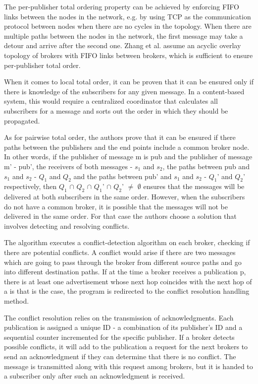 \documentclass{sigplanconf}
\begin{document}
The per-publisher total ordering property can be achieved by enforcing FIFO links between the nodes in the network, e.g. by using TCP as the communication protocol between nodes when there are no cycles in the topology. When there are multiple paths between the nodes in the network, the first message may take a detour and arrive after the second one. Zhang et al.\cite{totalorder} assume an acyclic overlay topology of brokers with FIFO links between brokers, which is sufficient to ensure per-publisher total order.

When it comes to local total order, it can be proven that it can be ensured only if there is knowledge of the subscribers for any given message. In a content-based system, this would require a centralized coordinator that calculates all subscribers for a message and sorts out the order in which they should be propagated.

As for pairwise total order, the authors prove that it can be ensured if there paths between the publishers and the end points include a common broker node. In other words, if the publisher of message m is pub and the publisher of message m' - pub', the receivers of both messages - $s_{1}$ and $s_{2}$, the paths between pub and $s_{1}$ and $s_{2}$ - $Q_{1}$ and $Q_{2}$ and the paths between pub' and $s_{1}$ and $s_{2}$ - $Q_{1}$' and $Q_{2}$' respectively, then $Q_{1}$ $\cap$ $Q_{2}$ $\cap$ $Q_{1}$' $\cap$ $Q_{2}$' $\neq$ $\emptyset$  ensures that the messages will be delivered at both subscribers in the same order. However, when the subscribers do not have a common broker, it is possible that the messages will not be delivered in the same order. For that case the authors choose a solution that involves detecting and resolving conflicts.

The algorithm executes a conflict-detection algorithm on each broker, checking if there are potential conflicts. A conflict would arise if there are two messages which are going to pass through the broker from different source paths and go into different destination paths. If at the time a broker receives a publication p, there is at least one advertisement whose next hop coincides with the next hop of a  is that is the case, the program is redirected to the conflict resolution handling method.

The conflict resolution relies on the transmission of acknowledgments. Each publication is assigned a unique ID - a combination of its publisher's ID and a sequential counter incremented for the specific publisher. If a broker detects possible conflicts, it will add to the publication a request for the next brokers to send an acknowledgment if they can determine that there is no conflict. The message is transmitted along with this request among brokers, but it is handed to a subscriber only after such an acknowledgment is received.
\end{document}
